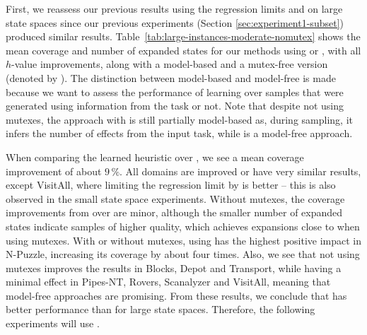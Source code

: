 First, we reassess our previous results using the regression limits \facts and \meanfx on large state spaces since our previous experiments (Section \ref{sec:experiment1-subset}) produced similar results. Table~\ref{tab:large-instances-moderate-nomutex} shows the mean coverage and number of expanded states for our methods using \facts or \meanfx, with all $h$-value improvements, along with a model-based and a mutex-free version (denoted by \hnnnomutex). The distinction between model-based and model-free is made because we want to assess the performance of learning over samples that were generated using information from the task or not. Note that despite not using mutexes, the approach with \hnnnomutexl{\meanfx} is still partially model-based as, during sampling, it infers the number of effects from the input task, while \hnnnomutexl{\facts} is a model-free approach.



When comparing the learned heuristic \hnnbfsrwl{\meanfx} over \hnnbfsrwl{\facts}, we see a mean coverage improvement of about $9\,\%$. All domains are improved or have very similar results, except VisitAll, where limiting the regression limit by \facts is better -- this is also observed in the small state space experiments. Without mutexes, the coverage improvements from \hnnnomutexl{\meanfx} over \hnnnomutexl{\facts} are minor, although the smaller number of expanded states indicate samples of higher quality, which achieves expansions close to when using mutexes. With or without mutexes, using \meanfx has the highest positive impact in N-Puzzle, increasing its coverage by about four times. Also, we see that not using mutexes improves the results in Blocks, Depot and Transport, while having a minimal effect in Pipes-NT, Rovers, Scanalyzer and VisitAll, meaning that model-free approaches are promising. From these results, we conclude that \meanfx has better performance than \facts for large state spaces. Therefore, the following experiments will use \meanfx.

